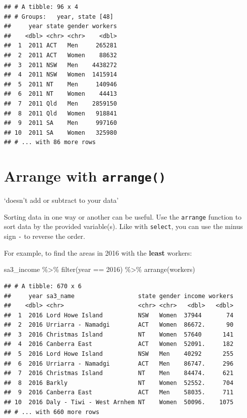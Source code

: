 \documentclass[
]{book}
\newenvironment{Shaded}{\begin{snugshade}}{\end{snugshade}}
\newcommand{\DecValTok}[1]{\textcolor[rgb]{0.00,0.00,0.81}{#1}}
\newcommand{\FunctionTok}[1]{\textcolor[rgb]{0.00,0.00,0.00}{#1}}
\newcommand{\NormalTok}[1]{#1}
\newcommand{\SpecialCharTok}[1]{\textcolor[rgb]{0.00,0.00,0.00}{#1}}
\begin{document}
\begin{verbatim}
## # A tibble: 96 x 4
## # Groups:   year, state [48]
##     year state gender workers
##    <dbl> <chr> <chr>    <dbl>
##  1  2011 ACT   Men     265281
##  2  2011 ACT   Women    88632
##  3  2011 NSW   Men    4438272
##  4  2011 NSW   Women  1415914
##  5  2011 NT    Men     140946
##  6  2011 NT    Women    44413
##  7  2011 Qld   Men    2859150
##  8  2011 Qld   Women   918841
##  9  2011 SA    Men     997160
## 10  2011 SA    Women   325980
## # ... with 86 more rows
\end{verbatim}

\hypertarget{arrange-with-arrange}{%
\section{\texorpdfstring{Arrange with \texttt{arrange()}}{Arrange with arrange()}}\label{arrange-with-arrange}}

`doesn't add or subtract to your data'

Sorting data in one way or another can be useful. Use the \texttt{arrange} function to sort data by the provided variable(s). Like with \texttt{select}, you can use the minus sign \texttt{-} to reverse the order.

For example, to find the areas in 2016 with the \textbf{least} workers:

\begin{Shaded}
\begin{Highlighting}[]
\NormalTok{sa3\_income }\SpecialCharTok{\%\textgreater{}\%}
  \FunctionTok{filter}\NormalTok{(year }\SpecialCharTok{==} \DecValTok{2016}\NormalTok{) }\SpecialCharTok{\%\textgreater{}\%} 
  \FunctionTok{arrange}\NormalTok{(workers)}
\end{Highlighting}
\end{Shaded}

\begin{verbatim}
## # A tibble: 670 x 6
##     year sa3_name                  state gender income workers
##    <dbl> <chr>                     <chr> <chr>   <dbl>   <dbl>
##  1  2016 Lord Howe Island          NSW   Women  37944       74
##  2  2016 Urriarra - Namadgi        ACT   Women  86672.      90
##  3  2016 Christmas Island          NT    Women  57640      141
##  4  2016 Canberra East             ACT   Women  52091.     182
##  5  2016 Lord Howe Island          NSW   Men    40292      255
##  6  2016 Urriarra - Namadgi        ACT   Men    86747.     296
##  7  2016 Christmas Island          NT    Men    84474.     621
##  8  2016 Barkly                    NT    Women  52552.     704
##  9  2016 Canberra East             ACT   Men    58035.     711
## 10  2016 Daly - Tiwi - West Arnhem NT    Women  50096.    1075
## # ... with 660 more rows
\end{verbatim}
\end{document}

